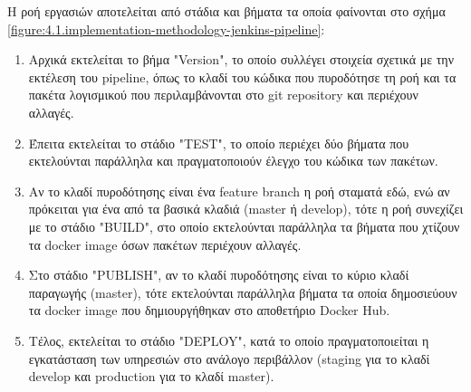 Η ροή εργασιών αποτελείται από στάδια και βήματα τα οποία φαίνονται στο σχήμα \ref{figure:4.1.implementation-methodology-jenkins-pipeline}:

\begin{enumerate}
    \item Αρχικά εκτελείται το βήμα "Version", το οποίο συλλέγει στοιχεία σχετικά με την εκτέλεση του pipeline, όπως το κλαδί του κώδικα που πυροδότησε τη ροή και τα πακέτα λογισμικού που περιλαμβάνονται στο git repository και περιέχουν αλλαγές.
    \item Έπειτα εκτελείται το στάδιο "TEST", το οποίο περιέχει δύο βήματα που εκτελούνται παράλληλα και πραγματοποιούν έλεγχο του κώδικα των πακέτων.
    \item Αν το κλαδί πυροδότησης είναι ένα feature branch η ροή σταματά εδώ, ενώ αν πρόκειται για ένα από τα βασικά κλαδιά (master ή develop), τότε η ροή συνεχίζει με το στάδιο "BUILD", στο οποίο εκτελούνται παράλληλα τα βήματα που χτίζουν τα docker image όσων πακέτων περιέχουν αλλαγές.
    \item Στο στάδιο "PUBLISH", αν το κλαδί πυροδότησης είναι το κύριο κλαδί παραγωγής (master), τότε εκτελούνται παράλληλα βήματα τα οποία δημοσιεύουν τα docker image που δημιουργήθηκαν στο αποθετήριο Docker Hub.
    \item Τέλος, εκτελείται το στάδιο "DEPLOY", κατά το οποίο πραγματοποιείται η εγκατάσταση των υπηρεσιών στο ανάλογο περιβάλλον (staging για το κλαδί develop και production για το κλαδί master).
\end{enumerate}


